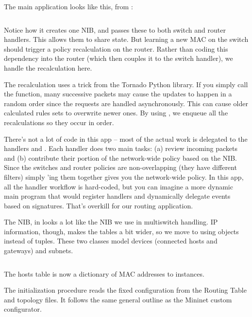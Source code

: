 The main application looks like this, from :

\inputminted{python}{code/routing/routing1.py}

Notice how it creates one NIB, and passes these to both switch and router handlers.  This allows
them to share state.  But learning a new MAC on the switch should trigger a policy recalculation on
the router.  Rather than coding this dependency into the router (which then couples it to the switch 
handler), we handle the recalculation here.  

The recalculation uses a trick from the Tornado Python library.  If you simply call the 
 function, many successive packets may cause the updates to 
happen in a random order since the requests are handled asynchronously.  This can cause older
calculated rules sets to overwrite newer ones.  By using , we enqueue
all the recalculations so they occur in order.  

There's not a lot of code in this app -- most of the actual work is delegated to the handlers
 and .  Each handler does two main tasks: (a) review
incoming packets and (b) contribute their portion of the network-wide policy based on the NIB.  
Since the switches and router policies are non-overlapping (they have different  filters)
simply 'ing them together gives you the network-wide policy.  
In this app, all the handler workflow is hard-coded, but you can imagine a more dynamic 
main program that would register handlers and dynamically delegate events based on signatures. 
That's overkill for our routing application.

The NIB, in  looks a lot like the NIB
we use in multiswitch handling.  IP information, though, makes the tables a bit wider, 
so we move to using objects instead of tuples.  These two classes model devices (connected hosts
and gateways) and subnets.    

\inputminted[firstline=5,lastline=31]{python}{code/routing/network_information_base.py} 

The hosts table is now a dictionary of MAC addresses to  instances. 

The initialization procedure reads the fixed configuration from the Routing Table and topology
files.  It follows the same general outline as the Mininet custom configurator.

